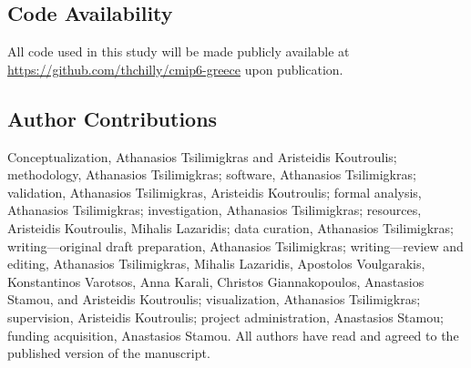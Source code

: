 \documentclass[pdflatex,sn-chicago]{sn-jnl}%
\theoremstyle{thmstyleone}%
\theoremstyle{thmstyletwo}%
\theoremstyle{thmstylethree}%
\begin{document}
\subsection*{Code Availability}
All code used in this study will be made publicly available at \url{https://github.com/thchilly/cmip6-greece} upon publication.

\subsection*{Author Contributions}

Conceptualization, Athanasios Tsilimigkras and Aristeidis Koutroulis; methodology, Athanasios Tsilimigkras; software, Athanasios Tsilimigkras; validation, Athanasios Tsilimigkras, Aristeidis Koutroulis; formal analysis, Athanasios Tsilimigkras; investigation, Athanasios Tsilimigkras; resources, Aristeidis Koutroulis, Mihalis Lazaridis; data curation, Athanasios Tsilimigkras; writing---original draft preparation, Athanasios Tsilimigkras; writing---review and editing, Athanasios Tsilimigkras, Mihalis Lazaridis, Apostolos Voulgarakis, Konstantinos Varotsos, Anna Karali, Christos Giannakopoulos, Anastasios Stamou, and Aristeidis Koutroulis; visualization, Athanasios Tsilimigkras; supervision, Aristeidis Koutroulis; project administration, Anastasios Stamou; funding acquisition, Anastasios Stamou. All authors have read and agreed to the published version of the manuscript.
\end{document}
